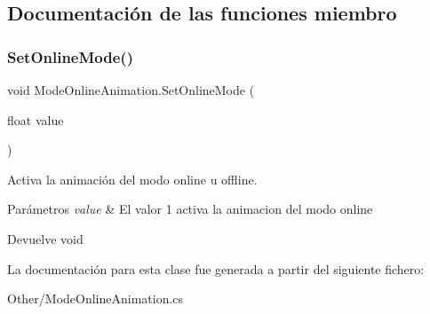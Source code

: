 \subsection{Documentación de las funciones miembro}
\mbox{\label{class_mode_online_animation_adfb83f8ce5c4c077045b68f876b5334e}} 
\subsubsection{\texorpdfstring{SetOnlineMode()}{SetOnlineMode()}}
{\footnotesize\ttfamily void Mode\+Online\+Animation.\+Set\+Online\+Mode (\begin{DoxyParamCaption}\item[{float}]{value }\end{DoxyParamCaption})\hspace{0.3cm}{\ttfamily [inline]}}

Activa la animación del modo online u offline. 
\begin{DoxyParams}{Parámetros}
{\em value} & El valor 1 activa la animacion del modo online \\
\hline
\end{DoxyParams}
\begin{DoxyReturn}{Devuelve}
void 
\end{DoxyReturn}


La documentación para esta clase fue generada a partir del siguiente fichero\+:\begin{DoxyCompactItemize}
\item 
Other/Mode\+Online\+Animation.\+cs\end{DoxyCompactItemize}
